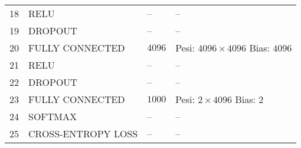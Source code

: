 \begin{table}[h]
\begin{tabularx}{\textwidth}{@{}llll@{}}
18 & RELU            & --            &     --      \\
19 & DROPOUT         & --            &    --       \\ \midrule
20 & FULLY CONNECTED &$4096$&\acapo{Pesi: $4096\times 4096$\\Bias: $4096$}\\
21 & RELU            & --            &   --        \\
22 & DROPOUT         & --            &   --        \\ \midrule
23 & FULLY CONNECTED &$1000$&\acapo{Pesi: $2\times 4096$\\Bias: $2$}\\
24 & SOFTMAX         & --            &    --       \\
25 & CROSS-ENTROPY LOSS  & --            &   --     \\ \bottomrule                 
\end{tabularx}
\end{table}

